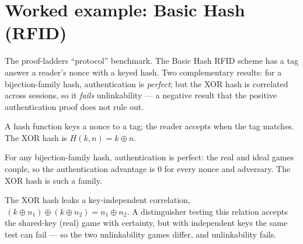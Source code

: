 \chapter{Worked example: Basic Hash (RFID)}

The proof-ladders ``protocol'' benchmark. The Basic Hash RFID scheme has a tag
answer a reader's nonce with a keyed hash. Two complementary results: for a
bijection-family hash, authentication is \emph{perfect}; but the XOR hash is
correlated across sessions, so it \emph{fails} unlinkability --- a negative result
that the positive authentication proof does not rule out.

\begin{definition}
  \label{def:basichash}
  \leanok
  A hash function keys a nonce to a tag; the reader accepts when the tag matches.
  The XOR hash is $H(k, n) = k \oplus n$.
\end{definition}

\begin{theorem}
  \label{thm:basichash-auth}
  \leanok
  For any bijection-family hash, authentication is perfect: the real and ideal
  games couple, so the authentication advantage is $0$ for every nonce and
  adversary. The XOR hash is such a family.
\end{theorem}

\begin{theorem}
  \label{thm:basichash-unlink}
  \leanok
  The XOR hash leaks a key-independent correlation, $\,(k \oplus n_1) \oplus (k
  \oplus n_2) = n_1 \oplus n_2$. A distinguisher testing this relation accepts the
  shared-key (real) game with certainty, but with independent keys the same test
  can fail --- so the two unlinkability games differ, and unlinkability fails.
\end{theorem}
